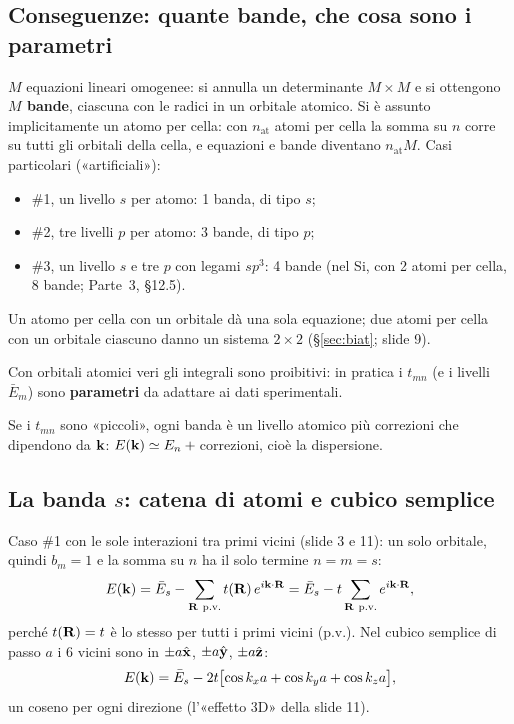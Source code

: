 \documentclass[11pt,a4paper]{article}
\begin{document}
\subsection{Conseguenze: quante bande, che cosa sono i parametri}
$M$ equazioni lineari omogenee: si annulla un determinante $M\times M$ e si ottengono \textbf{$M$ bande}, ciascuna con le radici in un orbitale
atomico. Si è assunto implicitamente un atomo per cella: con $n_{\mathrm{at}}$ atomi per cella la somma su $n$ corre su tutti gli orbitali della
cella, e equazioni e bande diventano $n_{\mathrm{at}}M$. Casi particolari («artificiali»):
\begin{itemize}[leftmargin=*]
\item \#1, un livello $s$ per atomo: 1 banda, di tipo $s$;
\item \#2, tre livelli $p$ per atomo: 3 bande, di tipo $p$;
\item \#3, un livello $s$ e tre $p$ con legami $sp^3$: 4 bande (nel Si, con 2 atomi per cella, 8 bande; Parte~3, §12.5).
\end{itemize}
Un atomo per cella con un orbitale dà una sola equazione; due atomi per cella con un orbitale ciascuno danno un sistema $2\times2$ (§\ref{sec:biat};
slide 9).

Con orbitali atomici veri gli integrali sono proibitivi: in pratica i $t_{mn}$ (e i livelli $\bar E_m$) sono \textbf{parametri} da adattare ai dati
sperimentali.

Se i $t_{mn}$ sono «piccoli», ogni banda è un livello atomico più correzioni che dipendono da $\mathbf k$: $E(\mathbf k)\simeq E_n+{}$correzioni, cioè la
dispersione.

\subsection{La banda $s$: catena di atomi e cubico semplice}\label{sec:bandas}
Caso \#1 con le sole interazioni tra primi vicini (slide 3 e 11): un solo orbitale, quindi $b_m=1$ e la somma su $n$ ha il solo termine $n=m=s$:
\[
E(\vk)=\bar E_s-\sum_{\vR\ \text{p.v.}}t(\vR)\,e^{i\vk\cdot\vR}=\bar E_s-t\sum_{\vR\ \text{p.v.}}e^{i\vk\cdot\vR},
\]
perché $t(\mathbf R)=t$ è lo stesso per tutti i primi vicini (p.v.). Nel cubico semplice di passo $a$ i 6 vicini sono in $\pm a\hat{\mathbf x}$, $\pm a\hat{\mathbf y}$, $\pm a\hat{\mathbf z}$:
\begin{equation}\label{eq:sc}
E(\mathbf k)=\bar E_s-2t\bigl[\cos k_xa+\cos k_ya+\cos k_za\bigr],
\end{equation}
un coseno per ogni direzione (l'«effetto 3D» della slide 11).
\end{document}
